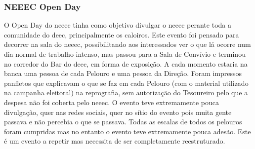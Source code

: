 
\subsubsection{NEEEC Open Day}

O Open Day do \acrshort{neeec} tinha como objetivo divulgar o \acrshort{neeec} perante toda a comunidade do \acrshort{deec}, principalmente os caloiros. Este evento foi pensado para decorrer na sala do \acrshort{neeec}, possibilitando aos interessados ver o que lá ocorre num dia normal de trabalho intenso, mas passou para a Sala de Convívio e terminou no corredor do Bar do \acrshort{deec}, em forma de exposição. A cada momento estaria na banca uma pessoa de cada Pelouro e uma pessoa da Direção. Foram impressos panfletos que explicavam o que se faz em cada Pelouro (com o material utilizado na campanha eleitoral) na reprografia, sem autorização do Tesoureiro pelo que a despesa não foi coberta pelo \acrshort{neeec}. O evento teve extremamente pouca divulgação, quer nas redes sociais, quer no sítio do evento pois muita gente passava e não percebia o que se passava. Todas as escalas de todos os pelouros foram cumpridas mas no entanto o evento teve extremamente pouca adesão. Este é um evento a repetir mas necessita de ser completamente reestruturado.